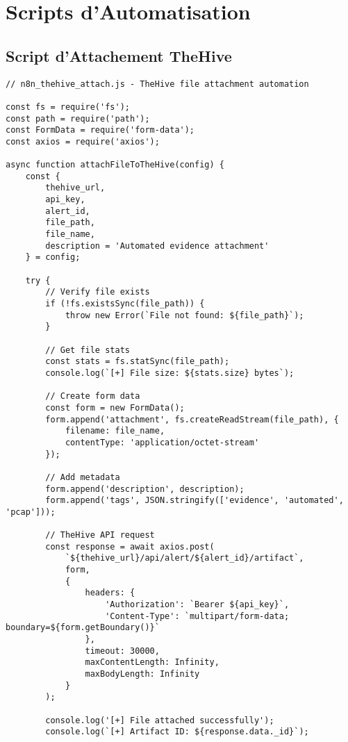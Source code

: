 \chapter{Scripts d'Automatisation}

\section{Script d'Attachement TheHive}

\begin{lstlisting}[style=jsstyle,caption=Script n8n pour attachement de fichiers TheHive]
// n8n_thehive_attach.js - TheHive file attachment automation

const fs = require('fs');
const path = require('path');
const FormData = require('form-data');
const axios = require('axios');

async function attachFileToTheHive(config) {
    const {
        thehive_url,
        api_key,
        alert_id,
        file_path,
        file_name,
        description = 'Automated evidence attachment'
    } = config;

    try {
        // Verify file exists
        if (!fs.existsSync(file_path)) {
            throw new Error(`File not found: ${file_path}`);
        }

        // Get file stats
        const stats = fs.statSync(file_path);
        console.log(`[+] File size: ${stats.size} bytes`);

        // Create form data
        const form = new FormData();
        form.append('attachment', fs.createReadStream(file_path), {
            filename: file_name,
            contentType: 'application/octet-stream'
        });

        // Add metadata
        form.append('description', description);
        form.append('tags', JSON.stringify(['evidence', 'automated', 'pcap']));

        // TheHive API request
        const response = await axios.post(
            `${thehive_url}/api/alert/${alert_id}/artifact`,
            form,
            {
                headers: {
                    'Authorization': `Bearer ${api_key}`,
                    'Content-Type': `multipart/form-data; boundary=${form.getBoundary()}`
                },
                timeout: 30000,
                maxContentLength: Infinity,
                maxBodyLength: Infinity
            }
        );

        console.log('[+] File attached successfully');
        console.log(`[+] Artifact ID: ${response.data._id}`);
        

\end{lstlisting}
